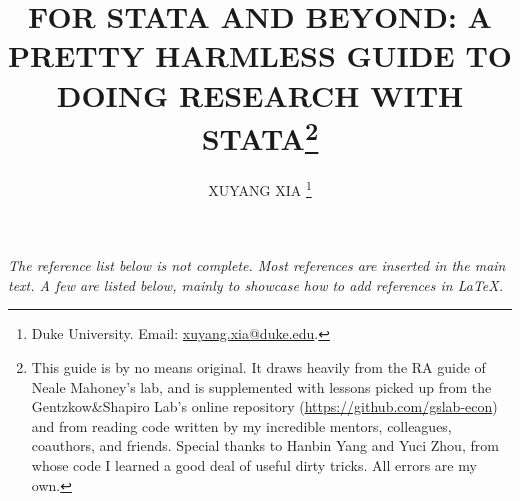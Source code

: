 
\usetikzlibrary{decorations.pathreplacing}
\usetikzlibrary{positioning}
\usetikzlibrary{arrows.meta}




\title{ \vspace{-0.4in} \textbf{\uppercase{\LARGE{For Stata and Beyond: A Pretty Harmless Guide to Doing Research with Stata}}}\thanks{This guide is by no means original. It draws heavily from the RA guide of Neale Mahoney’s lab, and is supplemented with lessons picked up from the Gentzkow{\&}Shapiro Lab’s online repository (\url{https://github.com/gslab-econ}) and from reading code written by my incredible mentors, colleagues, coauthors, and friends. Special thanks to Hanbin Yang and Yuci Zhou, from whose code I learned a good deal of useful dirty tricks. All errors are my own.}}

\author{
	\uppercase{Xuyang Xia} \thanks{Duke University. Email: \href{mailto:xuyang.xia@duke.edu}{xuyang.xia@duke.edu}.} 
}


\maketitle
\tableofcontents
\thispagestyle{empty} 
\setcounter{page}{0}
\vspace{-12pt}
% 

\clearpage





\newpage
\vspace{16pt}

\singlespacing 
\noindent\textit{The reference list below is not complete. Most references are inserted in the main text. A few are listed below, mainly to showcase how to add references in {\LaTeX.}}


\onehalfspacing

% 





